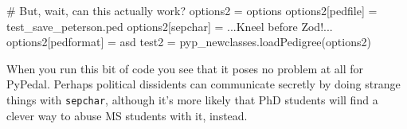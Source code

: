 \documentclass[
  letterpaper,
  DIV=11,
  numbers=noendperiod]{scrreprt}
\newenvironment{Shaded}{\begin{snugshade}}{\end{snugshade}}
\newcommand{\CommentTok}[1]{\textcolor[rgb]{0.37,0.37,0.37}{#1}}
\newcommand{\NormalTok}[1]{\textcolor[rgb]{0.00,0.23,0.31}{#1}}
\newcommand{\OperatorTok}[1]{\textcolor[rgb]{0.37,0.37,0.37}{#1}}
\newcommand{\StringTok}[1]{\textcolor[rgb]{0.13,0.47,0.30}{#1}}
\begin{document}
\begin{Shaded}
\begin{Highlighting}[]
\CommentTok{\# But, wait, can this actually work?}
\NormalTok{options2 }\OperatorTok{=}\NormalTok{ options}
\NormalTok{options2[}\StringTok{\textquotesingle{}pedfile\textquotesingle{}}\NormalTok{] }\OperatorTok{=} \StringTok{\textquotesingle{}test\_save\_peterson.ped\textquotesingle{}}
\NormalTok{options2[}\StringTok{\textquotesingle{}sepchar\textquotesingle{}}\NormalTok{] }\OperatorTok{=} \StringTok{\textquotesingle{}...Kneel before Zod!...\textquotesingle{}}
\NormalTok{options2[}\StringTok{\textquotesingle{}pedformat\textquotesingle{}}\NormalTok{] }\OperatorTok{=} \StringTok{\textquotesingle{}asd\textquotesingle{}}
\NormalTok{test2 }\OperatorTok{=}\NormalTok{ pyp\_newclasses.loadPedigree(options2)}
\end{Highlighting}
\end{Shaded}

When you run this bit of code you see that it poses no problem at all
for PyPedal. Perhaps political dissidents can communicate secretly by
doing strange things with \texttt{sepchar}, although it's more likely
that PhD students will find a clever way to abuse MS students with it,
instead.
\end{document}
